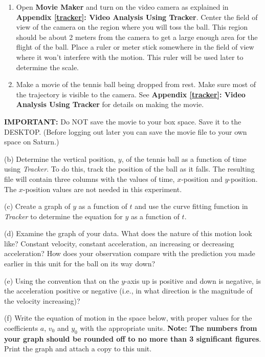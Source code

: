 \begin{enumerate}
\item Open \textbf{Movie Maker} and turn on the video camera as explained in \textbf{Appendix \ref{tracker}: Video Analysis Using Tracker}. Center the field of view of the camera on the region where you will toss the ball. This region should be about 2 meters from the camera to get a large enough area for the flight of the ball. Place a ruler or meter stick somewhere in the field of view where it won't interfere with the motion. This ruler will be used later to determine the scale. 
\item Make a movie of the tennis ball being dropped from rest. Make sure most of the trajectory is visible to the camera. See \textbf{Appendix \ref{tracker}: Video Analysis Using Tracker} for 
details on making the movie.
\end{enumerate}
\textbf{IMPORTANT:} Do NOT save the movie to your box space.  Save it to the DESKTOP.  (Before logging out later you can save the movie file to your own space on Saturn.)
\vspace{10mm}

(b) Determine the vertical position, $y$, of the tennis ball as a function of time using \textit{Tracker}. 
To do this, track the position of the ball as it falls. The resulting file will contain three columns with the values of time, $x$-position and $y$-position. The $x$-position values are not needed in this experiment.
\vspace{10mm}

(c) Create a graph of $y$ as a function of $t$ and use the curve fitting function in \textit{Tracker} to determine the equation for $y$ as a function of $t$.
\vspace{5mm}

\newpage
(d) Examine the graph of your data. What does the nature of this motion look
like? Constant velocity, constant acceleration, an increasing or decreasing
acceleration? How does your observation compare with the prediction you made
earlier in this unit for the ball on its way down?
\vspace{20mm}

(e) Using the convention that on the $y$-axis up is positive and down is negative, is the acceleration positive or negative (i.e., in what direction is the magnitude of the velocity increasing)?
\vspace{20mm}

(f) Write the equation of motion in the space below, with proper values for the coefficients 
$a$, \( v_{0} \) and \( y_{0} \) with the appropriate units. \textbf{Note: The numbers from 
your graph should be rounded off to no more than 3 significant figures}. Print the graph and 
attach a copy to this unit. 

